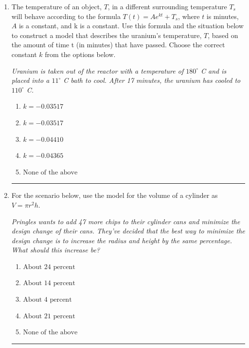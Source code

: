 \documentclass[14pt]{extbook}
\newcommand{\litem}[1]{\item#1\hspace*{-1cm}\rule{\textwidth}{0.4pt}}
\begin{document}
\begin{enumerate}
{\begin{enumerate}[label=\Alph*.]
\end{enumerate} }
\litem{
The temperature of an object, $T$, in a different surrounding temperature $T_s$ will behave according to the formula $T(t) = Ae^{kt} + T_s$, where $t$ is minutes, $A$ is a constant, and k is a constant. Use this formula and the situation below to construct a model that describes the uranium's temperature, $T$, based on the amount of time t (in minutes) that have passed. Choose the correct constant $k$ from the options below.
\begin{center}
    \textit{ Uranium is taken out of the reactor with a temperature of $180^{\circ}$ C and is placed into a $11^{\circ}$ C bath to cool. After 17 minutes, the uranium has cooled to $110^{\circ}$ C. }
\end{center}
\begin{enumerate}[label=\Alph*.]
\item \( k = -0.03517 \)
\item \( k = -0.03517 \)
\item \( k = -0.04410 \)
\item \( k = -0.04365 \)
\item \( \text{None of the above} \)

\end{enumerate} }
\litem{
For the scenario below, use the model for the volume of a cylinder as $V = \pi r^2 h$.
\begin{center}
    \textit{ Pringles wants to add 47 \text{percent} more chips to their cylinder cans and minimize the design change of their cans. They've decided that the best way to minimize the design change is to increase the radius and height by the same percentage. What should this increase be? }
\end{center}
\begin{enumerate}[label=\Alph*.]
\item \( \text{About } 24 \text{ percent} \)
\item \( \text{About } 14 \text{ percent} \)
\item \( \text{About } 4 \text{ percent} \)
\item \( \text{About } 21 \text{ percent} \)
\item \( \text{None of the above} \)


\end{enumerate}}
\end{enumerate}
\end{document}
